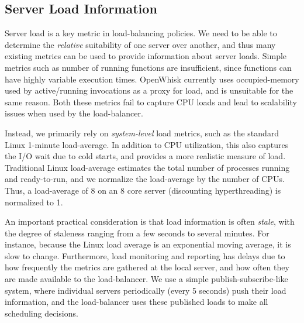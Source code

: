 \subsection{Server Load Information}

Server load is a key metric in load-balancing policies.
We need to be able to determine the \emph{relative} suitability of one server over another, and thus many existing metrics can be used to provide information about server loads.
%
Simple metrics such as number of running functions are insufficient, since functions can have highly variable execution times. 
OpenWhisk currently uses occupied-memory used by active/running invocations as a proxy for load, and is unsuitable for the same reason. 
Both these metrics fail to capture CPU loads and lead to scalability issues when used by the load-balancer. 




Instead, we primarily rely on \emph{system-level} load metrics, such as the standard Linux 1-minute load-average.
In addition to CPU utilization, this also captures the I/O wait due to cold starts, and provides a more realistic measure of load.
Traditional Linux load-average estimates the total number of processes running and ready-to-run, and we normalize the load-average by the number of CPUs. 
Thus, a load-average of $8$ on an 8 core server (discounting hyperthreading) is normalized to 1. 

An important practical consideration is that load information is often \emph{stale}, with the degree of staleness ranging from a few seconds to several minutes. 
For instance, because the Linux load average is an exponential moving average, it is slow to change.
Furthermore, load monitoring and reporting has delays due to how frequently the metrics are gathered at the local server, and how often they are made available to the load-balancer.
We use a simple publish-subscribe-like system, where individual servers periodically (every 5 seconds) push their load information, and the load-balancer uses these published loads to make all scheduling decisions.


